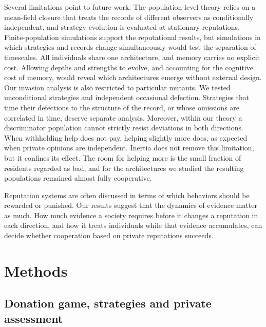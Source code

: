 \documentclass[10pt]{wlscirep}
\theoremstyle{plain}
\theoremstyle{remark}
\begin{document}
Several limitations point to future work. The population-level theory relies on a mean-field closure that treats the records of different observers as conditionally independent, and strategy evolution is evaluated at stationary reputations. Finite-population simulations support the reputational results, but simulations in which strategies and records change simultaneously would test the separation of timescales. All individuals share one architecture, and memory carries no explicit cost. Allowing depths and strengths to evolve, and accounting for the cognitive cost of memory, would reveal which architectures emerge without external design. Our invasion analysis is also restricted to particular mutants. We tested unconditional strategies and independent occasional defection. Strategies that time their defections to the structure of the record, or whose omissions are correlated in time, deserve separate analysis. Moreover, within our theory a discriminator population cannot strictly resist deviations in both directions. When withholding help does not pay, helping slightly more does, as expected when private opinions are independent\cite{murase2024synchronization}. Inertia does not remove this limitation, but it confines its effect. The room for helping more is the small fraction of residents regarded as bad, and for the architectures we studied the resulting populations remained almost fully cooperative.

Reputation systems are often discussed in terms of which behaviors should be rewarded or punished. Our results suggest that the dynamics of evidence matter as much. How much evidence a society requires before it changes a reputation in each direction, and how it treats individuals while that evidence accumulates, can decide whether cooperation based on private reputations succeeds.

\section*{Methods}
\label{sec:methods}

\subsection*{Donation game, strategies and private assessment}
\end{document}
